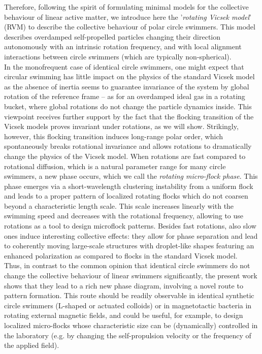 \documentclass[aps,twocolumn,showlabels,showrefs,amsmath,amssymb,pre,superscriptaddress, floatfix, colors]{revtex4}
\newcommand{\1}{\begin{equation}}
\newcommand{\2}{\end{equation}}
\newcommand{\4}[2]{{\frac{#1}{#2}}}
\begin{document}
Therefore, following the spirit of formulating minimal models for the collective behaviour of linear active matter, we introduce here 
the '\emph{rotating Vicsek model}' (RVM) to 
describe the collective behaviour of polar circle swimmers. 
This model describes overdamped self-propelled particles changing their direction autonomously with an intrinsic rotation frequency,
and with local alignment interactions between circle swimmers (which are typically non-spherical). 
\\In the monofrequent case of identical circle swimmers, 
one might expect that circular swimming has little impact on the physics of the standard Vicsek model
as the absence of inertia seems to guarantee invariance of the system by global rotation of the reference frame -- as for an overdamped ideal gas in a rotating bucket, where global rotations 
do not change the particle dynamics inside. 
This viewpoint receives further support
by the fact that the flocking transition of the Vicsek models proves invariant under rotations, as we will show.  
Strikingly, however, this flocking transition induces long-range polar order, which spontaneously breaks 
rotational invariance and allows rotations to dramatically change the physics of the Vicsek model. 
When rotations are fast compared to rotational diffusion, which is a natural parameter range for many circle swimmers,
a new phase occurs, which we call the \emph{rotating micro-flock phase}.  
This phase emerges via a short-wavelength clustering instability from a uniform flock and leads to a proper pattern of localized rotating flocks 
which do not coarsen beyond a characteristic length scale. This scale increases linearly with the swimming speed and decreases with the rotational frequency, allowing to use 
rotations as a tool to design microflock patterns. 
Besides fast rotations, also slow ones induce interesting collective effects:
they allow for phase separation and lead to coherently moving large-scale structures with droplet-like shapes 
featuring an enhanced polarization as compared to flocks in the standard Vicsek model.
\\Thus, in contrast to the common opinion that identical circle swimmers do not change the collective behaviour of linear swimmers significantly, 
the present work shows that they lead to a rich new phase diagram, involving a novel route to pattern formation.
This route should be readily observable in identical synthetic circle swimmers (L-shaped or actuated colloids)  
or in magnetotactic bacteria in rotating external magnetic fields, and could be useful, for example, 
to design localized micro-flocks whose characteristic size can be (dynamically) controlled in the laboratory (e.g. by changing the self-propulsion velocity or the frequency of the applied field). 
\end{document}
